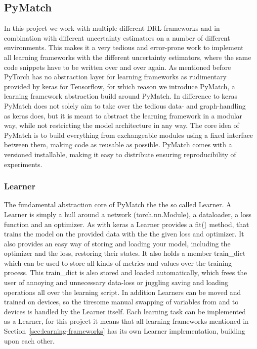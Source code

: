 \documentclass[11pt,a4paper]{article}
\begin{document}
	\subsection{PyMatch}\label{subsec:pymatch}
	In this project we work with multiple different DRL frameworks and in combination with different uncertainty estimators on a number of different environments.
	This makes it a very tedious and error-prone work to implement all learning frameworks with the different uncertainty estimators, where the same code snippets have to be written over and over again.
	As mentioned before PyTorch has no abstraction layer for learning frameworks as rudimentary provided by keras for Tensorflow, for which reason we introduce PyMatch, a learning framework abstraction build around PyMatch.
	In difference to keras PyMatch does not solely aim to take over the tedious data- and graph-handling as keras does, but it is meant to abstract the learning framework in a modular way, while not restricting the model architecture in any way.
	The core idea of PyMatch is to build everything from exchangeable modules using a fixed interface between them, making code as reusable as possible.
	PyMatch comes with a versioned installable, making it easy to distribute ensuring reproducibility of experiments.\\

	\subsubsection{Learner}
	The fundamental abstraction core of PyMatch the the so called Learner.
	A Learner is simply a hull around a network (torch.nn.Module), a dataloader, a loss function and an optimizer.
	As with keras a Learner provides a fit() method, that trains the model on the provided data with the the given loss and optimizer.
	It also provides an easy way of storing and loading your model, including the optimizer and the loss, restoring their states.
	It also holds a member train\_dict which can be used to store all kinds of metrics and values over the training process.
	This train\_dict is also stored and loaded automatically, which frees the user of annoying and unnecessary data-loss or juggling saving and loading operations all over the learning script.
	In addition Learners can be moved and trained on devices, so the tiresome manual swapping of variables from and to devices is handled by the Learner itself.
	Each learning task can be implemented as a Learner, for this project it means that all learning frameworks mentioned in Section~\ref{sec:learning-frameworks} has its own Learner implementation, building upon each other.
\end{document}
